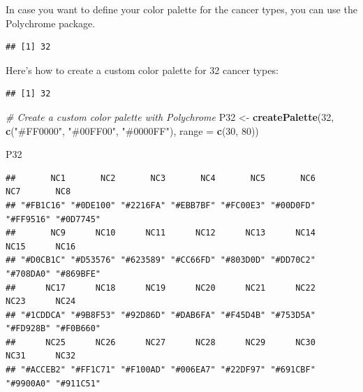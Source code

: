 \documentclass[
]{book}
\newenvironment{Shaded}{\begin{snugshade}}{\end{snugshade}}
\newcommand{\AttributeTok}[1]{\textcolor[rgb]{0.13,0.29,0.53}{#1}}
\newcommand{\CommentTok}[1]{\textcolor[rgb]{0.56,0.35,0.01}{\textit{#1}}}
\newcommand{\DecValTok}[1]{\textcolor[rgb]{0.00,0.00,0.81}{#1}}
\newcommand{\FunctionTok}[1]{\textcolor[rgb]{0.13,0.29,0.53}{\textbf{#1}}}
\newcommand{\NormalTok}[1]{#1}
\newcommand{\OtherTok}[1]{\textcolor[rgb]{0.56,0.35,0.01}{#1}}
\newcommand{\SpecialCharTok}[1]{\textcolor[rgb]{0.81,0.36,0.00}{\textbf{#1}}}
\newcommand{\StringTok}[1]{\textcolor[rgb]{0.31,0.60,0.02}{#1}}
\begin{document}
In case you want to define your color palette for the cancer types, you can use the Polychrome package.

\begin{Shaded}
\end{Shaded}

\begin{verbatim}
## [1] 32
\end{verbatim}

Here's how to create a custom color palette for 32 cancer types:

\begin{Shaded}
\end{Shaded}

\begin{verbatim}
## [1] 32
\end{verbatim}

\begin{Shaded}
\begin{Highlighting}[]
\CommentTok{\# Create a custom color palette with Polychrome}
\NormalTok{P32 }\OtherTok{\textless{}{-}} \FunctionTok{createPalette}\NormalTok{(}\DecValTok{32}\NormalTok{, }\FunctionTok{c}\NormalTok{(}\StringTok{"\#FF0000"}\NormalTok{, }\StringTok{"\#00FF00"}\NormalTok{, }\StringTok{"\#0000FF"}\NormalTok{), }\AttributeTok{range =} \FunctionTok{c}\NormalTok{(}\DecValTok{30}\NormalTok{, }\DecValTok{80}\NormalTok{))}

\NormalTok{P32}
\end{Highlighting}
\end{Shaded}

\begin{verbatim}
##       NC1       NC2       NC3       NC4       NC5       NC6       NC7       NC8 
## "#FB1C16" "#0DE100" "#2216FA" "#EBB7BF" "#FC00E3" "#00D0FD" "#FF9516" "#0D7745" 
##       NC9      NC10      NC11      NC12      NC13      NC14      NC15      NC16 
## "#D0CB1C" "#D53576" "#623589" "#CC66FD" "#803D0D" "#DD70C2" "#708DA0" "#869BFE" 
##      NC17      NC18      NC19      NC20      NC21      NC22      NC23      NC24 
## "#1CDDCA" "#9B8F53" "#92D86D" "#DAB6FA" "#F45D4B" "#753D5A" "#FD928B" "#F0B660" 
##      NC25      NC26      NC27      NC28      NC29      NC30      NC31      NC32 
## "#ACCEB2" "#FF1C71" "#F100AD" "#006EA7" "#22DF97" "#691CBF" "#9900A0" "#911C51"
\end{verbatim}
\end{document}
